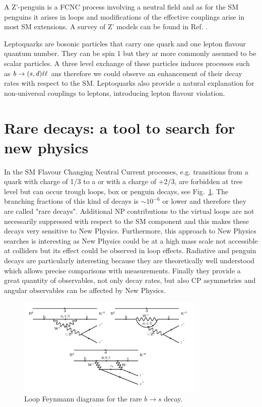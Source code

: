 A Z'-penguin is a FCNC process involving a neutral field and as for the SM penguins it arises in
loops and modifications of the effective couplings arise in most SM extensions.
A survey of Z' models can be found in Ref. \cite{}.

Leptoquarks are bosonic particles that carry one quark and one lepton flavour quantum number.
They can be spin 1 but they ar more commonly assumed to be scalar particles.
A three level exchange of these particles induces processes such as $b \rightarrow (s,d)\ell\ell$
ans therefore we could observe an enhancement of their decay rates with respect to the SM.
Leptoquarks also provide a natural explanation for non-universal couplings to leptons,
introducing lepton flavour violation.


\section{Rare decays: a tool to search for new physics}

In the SM Flavour Changing Neutral Current processes, e.g. transitions from a
\bquark quark with charge of 1/3 to a \squark or \dquark with a charge of +2/3, 
are forbidden at tree level but can occur trough loops, box or penguin decays, see Fig.~\ref{fig:penguins}.
The branching fractions of this kind of decays is $\sim 10^{-6}$ or lower and therefore
they are called "rare decays". Additional NP contributions to the virtual loops
are not necessarily suppressed with respect to the SM component and this makes these decays
very sensitive to New Physics. Furthermore, this approach to New Physics searches is interesting as
New Physics could be at a high mass scale not accessible at colliders but its effect could be observed in loop effects.
Radiative and penguin decays are particularly interesting because they are theoretically
well understood which allows precise comparisons with measurements. Finally they provide
a great quantity of observables, not only decay rates, but also CP asymmetries and
angular observables can be affected by New Physics.

\begin{figure}[h!]
\centering
\includegraphics[width=0.8\textwidth]{Introduction/figs/penguins3.png}
\caption{Loop Feynmann diagrams for the rare $b \rightarrow s $ decay.}
\label{fig:penguins}
\end{figure}

